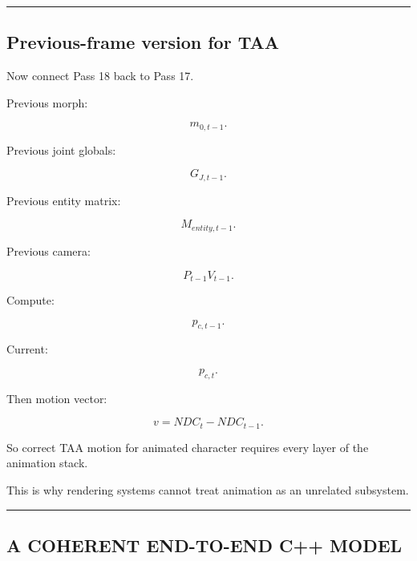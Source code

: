 \begin{center}\rule{0.5\linewidth}{0.5pt}\end{center}

\subsection{Previous-frame version for TAA}\label{04-visual-computing-ii-ch041-previous-frame-version-for-taa}

\hypertarget{04-visual-computing-ii-ch041-previous-frame-version-for-taa}{}

Now connect Pass 18 back to Pass 17.

Previous morph:

\[
m_{0,t-1}.
\]

Previous joint globals:

\[
G_{J,t-1}.
\]

Previous entity matrix:

\[
M_{entity,t-1}.
\]

Previous camera:

\[
P_{t-1}V_{t-1}.
\]

Compute:

\[
p_{c,t-1}.
\]

Current:

\[
p_{c,t}.
\]

Then motion vector:

\[
v=
NDC_t-NDC_{t-1}.
\]

So correct TAA motion for animated character requires every layer of the animation stack.

This is why rendering systems cannot treat animation as an unrelated subsystem.

\begin{center}\rule{0.5\linewidth}{0.5pt}\end{center}

\subsection{A COHERENT END-TO-END C++ MODEL}\label{04-visual-computing-ii-ch041-a-coherent-end-to-end-c-model}

\hypertarget{04-visual-computing-ii-ch041-a-coherent-end-to-end-c-model}{}


